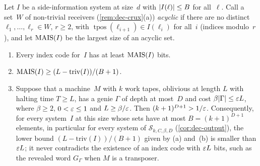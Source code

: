 \begin{proposition}\label{prop:dec-counting}
\notformalized
Let $I$ be a side-information system at size~$d$ with $\lvert I(\ell) \rvert\le B$ for all~$\ell$. Call a set~$W$ of
non-trivial receivers (\cref{rem:dec-crux}(a)) \emph{acyclic} if there are no distinct $\ell_1,\dots,\ell_r\in W$, $r\ge2$, with
$\operatorname{tpos}(\ell_{i+1})\in I(\ell_i)$ for all~$i$ (indices modulo~$r$), and let $\mathrm{MAIS}(I)$ be the largest
size of an acyclic set.
\begin{enumerate}[label=(\alph*)]
\item Every index code for~$I$ has at least $\mathrm{MAIS}(I)$ bits.
\item $\mathrm{MAIS}(I)\ge(L-\mathrm{triv}(I))/(B+1)$.
\item Suppose that a machine~$M$ with $k$ work tapes, oblivious at length $L$ with halting time $T\ge L$, has a genie
$\Gamma$ of depth at most~$D$ and cost $\beta\lvert \Gamma \rvert\le\varepsilon L$, where $\beta\ge2$, $0<\varepsilon\le1$ and
$L\ge\beta/\varepsilon$. Then $(k+1)^{D+1}>1/\varepsilon$. Consequently, for every system~$I$ at this size whose sets have at most
$B=(k+1)^{D+1}$ elements, in particular for every system of $\mathcal S_{k,C,\beta,D}$ (\cref{cor:dec-output}), the
lower bound $(L-\mathrm{triv}(I))/(B+1)$ given by (a) and~(b) is smaller than $\varepsilon L$; it never contradicts the
existence of an index code with $\varepsilon L$ bits, such as the revealed word $G_\Gamma$ when $M$ is a transposer.
\end{enumerate}
\end{proposition}

